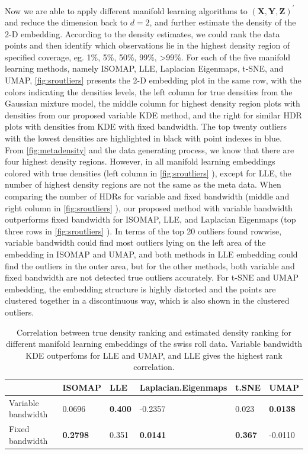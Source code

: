 \documentclass[11pt,a4paper,]{article}
\begin{document}
Now we are able to apply different manifold learning algorithms to
\((\pmb{X}, \pmb{Y}, \pmb{Z})^\prime\) and reduce the dimension back to
\(d=2\), and further estimate the density of the 2-D embedding. According
to the density estimates, we could rank the data points and then
identify which observations lie in the highest density region of
specified coverage, eg. 1\%, 5\%, 50\%, 99\%, \textgreater99\%. For each of the five
manifold learning methods, namely ISOMAP, LLE, Laplacian Eigenmaps,
t-SNE, and UMAP, \autoref{fig:sroutliers} presents the 2-D embedding
plot in the same row, with the colors indicating the densities levels,
the left column for true densities from the Gaussian mixture model, the
middle column for highest density region plots with densities from our
proposed variable KDE method, and the right for similar HDR plots with
densities from KDE with fixed bandwidth. The top twenty outliers with
the lowest densities are highlighted in black with point indexes in
blue. From \autoref{fig:metadensity} and the data generating process, we
know that there are four highest density regions. However, in all
manifold learning embeddings colored with true densities (left column in
\autoref{fig:sroutliers} ), except for LLE, the number of highest
density regions are not the same as the meta data. When comparing the
number of HDRs for variable and fixed bandwidth (middle and right column
in \autoref{fig:sroutliers} ), our proposed method with variable
bandwidth outperforms fixed bandwidth for ISOMAP, LLE, and Laplacian
Eigenmaps (top three rows in \autoref{fig:sroutliers} ). In terms of the
top 20 outliers found rowwise, variable bandwidth could find most
outliers lying on the left area of the embedding in ISOMAP and UMAP, and
both methods in LLE embedding could find the outliers in the outer area,
but for the other methods, both variable and fixed bandwidth are not
detected true outliers accurately. For t-SNE and UMAP embedding, the
embedding structure is highly distorted and the points are clustered
together in a discontinuous way, which is also shown in the clustered
outliers.

\begin{table}

\caption{\label{tab:srcors}Correlation between true density ranking and estimated density ranking for different manifold learning embeddings of the swiss roll data. Variable bandwidth KDE outperfoms for LLE and UMAP, and LLE gives the highest rank correlation.}
\centering
\begin{tabular}[t]{l>{}l>{}l>{}l>{}l>{}l}
\toprule
  & ISOMAP & LLE & Laplacian.Eigenmaps & t.SNE & UMAP\\
\midrule
Variable bandwidth & 0.0696 & \textbf{0.400} & -0.2357 & 0.023 & \textbf{0.0138}\\
Fixed bandwidth & \textbf{0.2798} & 0.351 & \textbf{0.0141} & \textbf{0.367} & -0.0110\\
\bottomrule
\end{tabular}
\end{table}
\end{document}
